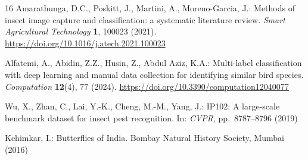 \documentclass[runningheads]{llncs}
\begin{document}
\begin{thebibliography}{16}
Amarathunga, D.C., Poskitt, J., Martini, A., Moreno-Garcia, J.: Methods of insect image capture and classification: a systematic literature review. \emph{Smart Agricultural Technology} \textbf{1}, 100023 (2021). \url{https://doi.org/10.1016/j.atech.2021.100023}

Alfatemi, A., Abidin, Z.Z., Husin, Z., Abdul Aziz, K.A.: Multi-label classification with deep learning and manual data collection for identifying similar bird species. \emph{Computation} \textbf{12}(4), 77 (2024). \url{https://doi.org/10.3390/computation12040077}

Wu, X., Zhan, C., Lai, Y.-K., Cheng, M.-M., Yang, J.: IP102: A large-scale benchmark dataset for insect pest recognition. In: \emph{CVPR}, pp.~8787--8796 (2019)

Kehimkar, I.: Butterflies of India. Bombay Natural History Society, Mumbai (2016)

\end{thebibliography}
\end{document}
